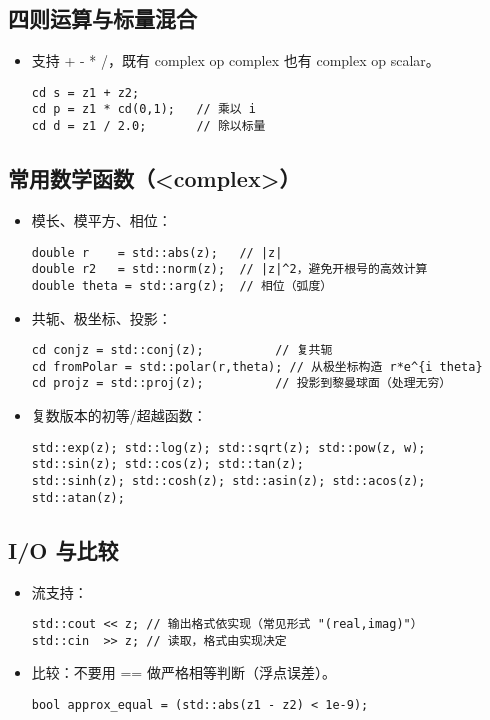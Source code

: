 \documentclass[a4paper]{report}
\begin{document}
\subsection*{四则运算与标量混合}
\begin{itemize}
  \item 支持 + - * /，既有 complex op complex 也有 complex op scalar。
\begin{verbatim}
cd s = z1 + z2;
cd p = z1 * cd(0,1);   // 乘以 i
cd d = z1 / 2.0;       // 除以标量
\end{verbatim}
\end{itemize}

\subsection*{常用数学函数（<complex>）}
\begin{itemize}
  \item 模长、模平方、相位：
  \begin{verbatim}
double r    = std::abs(z);   // |z|
double r2   = std::norm(z);  // |z|^2，避免开根号的高效计算
double theta = std::arg(z);  // 相位（弧度）
  \end{verbatim}
  \item 共轭、极坐标、投影：
  \begin{verbatim}
cd conjz = std::conj(z);          // 复共轭
cd fromPolar = std::polar(r,theta); // 从极坐标构造 r*e^{i theta}
cd projz = std::proj(z);          // 投影到黎曼球面（处理无穷）
  \end{verbatim}
  \item 复数版本的初等/超越函数：
  \begin{verbatim}
std::exp(z); std::log(z); std::sqrt(z); std::pow(z, w);
std::sin(z); std::cos(z); std::tan(z);
std::sinh(z); std::cosh(z); std::asin(z); std::acos(z); std::atan(z);
  \end{verbatim}
\end{itemize}

\subsection*{I/O 与比较}
\begin{itemize}
  \item 流支持：
\begin{verbatim}
std::cout << z; // 输出格式依实现（常见形式 "(real,imag)"）
std::cin  >> z; // 读取，格式由实现决定
\end{verbatim}
  \item 比较：不要用 == 做严格相等判断（浮点误差）。
\begin{verbatim}
bool approx_equal = (std::abs(z1 - z2) < 1e-9);
\end{verbatim}
\end{itemize}
\end{document}

